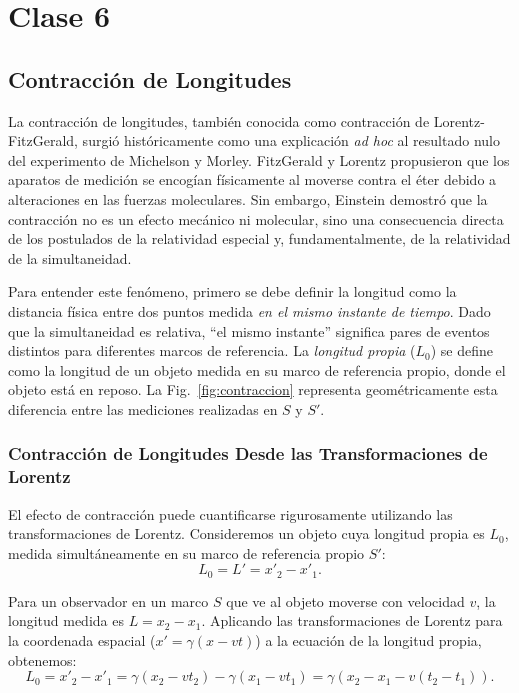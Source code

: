 \chapter{Clase 6}

\section{Contracción de Longitudes}

La contracción de longitudes, también conocida como contracción de Lorentz-FitzGerald, surgió históricamente como una explicación \emph{ad hoc} al resultado nulo del experimento de Michelson y Morley. FitzGerald y Lorentz propusieron que los aparatos de medición se encogían físicamente al moverse contra el éter debido a alteraciones en las fuerzas moleculares. Sin embargo, Einstein demostró que la contracción no es un efecto mecánico ni molecular, sino una consecuencia directa de los postulados de la relatividad especial y, fundamentalmente, de la relatividad de la simultaneidad.

Para entender este fenómeno, primero se debe definir la longitud como la distancia física entre dos puntos medida \emph{en el mismo instante de tiempo}. Dado que la simultaneidad es relativa, ``el mismo instante'' significa pares de eventos distintos para diferentes marcos de referencia. La \emph{longitud propia} ($L_0$) se define como la longitud de un objeto medida en su marco de referencia propio, donde el objeto está en reposo. La Fig.~\ref{fig:contraccion} representa geométricamente esta diferencia entre las mediciones realizadas en $S$ y $S'$.



\subsection{Contracción de Longitudes Desde las Transformaciones de Lorentz}

El efecto de contracción puede cuantificarse rigurosamente utilizando las transformaciones de Lorentz. Consideremos un objeto cuya longitud propia es $L_0$, medida simultáneamente en su marco de referencia propio $S'$:
$$
L_0 = L' = x'_2 - x'_1.
$$

Para un observador en un marco $S$ que ve al objeto moverse con velocidad $v$, la longitud medida es $L = x_2 - x_1$. Aplicando las transformaciones de Lorentz para la coordenada espacial ($x' = \gamma(x - vt)$) a la ecuación de la longitud propia, obtenemos:
$$
L_0 = x'_2 - x'_1 = \gamma(x_2 - vt_2) - \gamma(x_1 - vt_1) = \gamma(x_2 - x_1 - v(t_2 - t_1)).
$$

